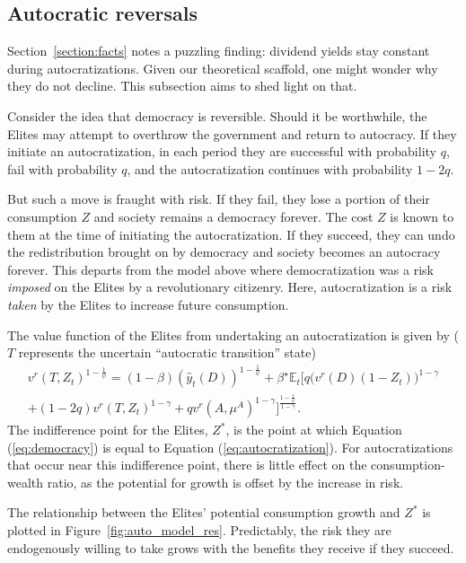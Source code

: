 \documentclass[12pt]{article}
\numberwithin{equation}{section}
\begin{document}
\subsection{Autocratic reversals}\label{section:auto_reverse}

Section~\ref{section:facts} notes a puzzling finding: dividend yields stay constant during autocratizations.  Given our theoretical scaffold, one might wonder why they do not decline. This subsection aims to shed light on that.

Consider the idea that democracy is reversible. Should it be worthwhile, the Elites may attempt to overthrow the government and return to autocracy.  If they initiate an autocratization, in each period they are successful with probability $q$, fail with probability $q$, and the autocratization continues with probability $1-2q$.

But such a move is fraught with risk. If they fail, they lose a portion of their consumption $Z$ and society remains a democracy forever. The cost $Z$ is known to them at the time of initiating the autocratization. If they succeed, they can undo the redistribution brought on by democracy and society becomes an autocracy forever.  This departs from the model above where democratization was a risk \textit{imposed} on the Elites by a revolutionary citizenry. Here, autocratization is a risk \textit{taken} by the Elites to increase future consumption.

The value function of the Elites from undertaking an autocratization is given by ($T$ represents the uncertain ``autocratic transition'' state)
\begin{multline}
v^r(T,Z_t)^{1-\frac{1}{\psi}} = (1-\beta)(\hat{y}_t(D))^{1-\frac{1}{\psi}} + \beta^\star \mathbb{E}_t\bigg[q \Big(v^r(D)(1-Z_t)\Big)^{1-\gamma} \\ + (1-2q)v^r(T,Z_t)^{1-\gamma} + q v^{r}(A,\mu^A)^{1-\gamma}\bigg]^{\frac{1-\frac{1}{\psi}}{1-\gamma}}.\label{eq:autocratization}
\end{multline}
The indifference point for the Elites, $Z^*$, is the point at which Equation (\ref{eq:democracy}) is equal to Equation (\ref{eq:autocratization}). For autocratizations that occur near this indifference point, there is little effect on the consumption-wealth ratio, as the potential for growth is offset by the increase in risk.  

The relationship between the Elites' potential consumption growth and $Z^*$ is plotted in Figure~\ref{fig:auto_model_res}. Predictably, the risk they are endogenously willing to take grows with the benefits they receive if they succeed.
\end{document}
